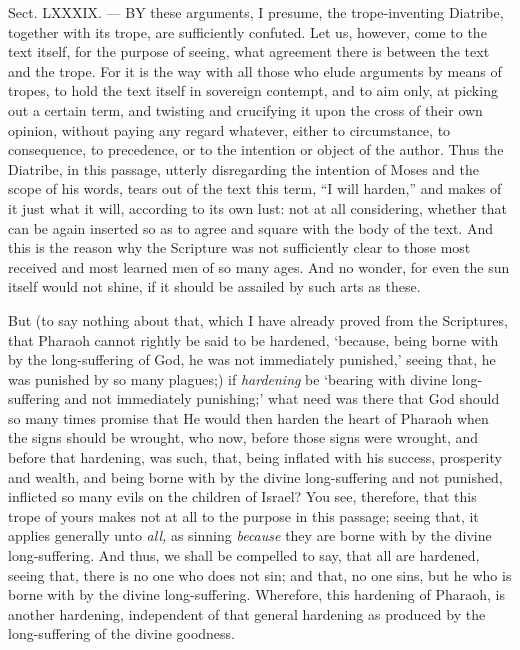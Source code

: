 
Sect. LXXXIX. — BY these arguments, I presume, the trope-inventing Diatribe, together with its trope, are sufficiently confuted. Let us, however, come to the text itself, for the purpose of seeing, what agreement there is between the text and the trope. For it is the way with all those who elude arguments by means of tropes, to hold the text itself in sovereign contempt, and to aim only, at picking out a certain term, and twisting and crucifying it upon the cross of their own opinion, without paying any regard whatever, either to circumstance, to consequence, to precedence, or to the intention or object of the author. Thus the Diatribe, in this passage, utterly disregarding the intention of Moses and the scope of his words, tears out of the text this term, “I will harden,” and makes of it just what it will, according to its own lust: not at all considering, whether that can be again inserted so as to agree and square with the body of the text. And this is the reason why the Scripture was not sufficiently clear to those most received and most learned men of so many ages. And no wonder, for even the sun itself would not shine, if it should be assailed by such arts as these.

But (to say nothing about that, which I have already proved from the Scriptures, that Pharaoh cannot rightly be said to be hardened, ‘because, being borne with by the long-suffering of God, he was not immediately punished,’ seeing that, he was punished by so many plagues;) if \emph{hardening }be ‘bearing with divine long-suffering and not immediately punishing;’ what need was there that God should so many times promise that He would then harden the heart of Pharaoh when the signs should be wrought, who now, before those signs were wrought, and before that hardening, was such, that, being inflated with his success, prosperity and wealth, and being borne with by the divine long-suffering and not punished, inflicted so many evils on the children of Israel? You see, therefore, that this trope of yours makes not at all to the purpose in this passage; seeing that, it applies generally unto \emph{all, }as sinning \emph{because }they are borne with by the divine long-suffering. And thus, we shall be compelled to say, that all are hardened, seeing that, there is no one who does not sin; and that, no one sins, but he who is borne with by the divine long-suffering. Wherefore, this hardening of Pharaoh, is another hardening, independent of that general hardening as produced by the long-suffering of the divine goodness.


